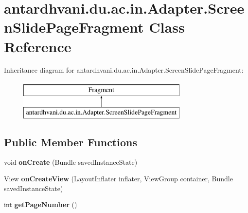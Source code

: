 \hypertarget{classantardhvani_1_1du_1_1ac_1_1in_1_1_adapter_1_1_screen_slide_page_fragment}{}\section{antardhvani.\+du.\+ac.\+in.\+Adapter.\+Screen\+Slide\+Page\+Fragment Class Reference}
\label{classantardhvani_1_1du_1_1ac_1_1in_1_1_adapter_1_1_screen_slide_page_fragment}
Inheritance diagram for antardhvani.\+du.\+ac.\+in.\+Adapter.\+Screen\+Slide\+Page\+Fragment\+:\begin{figure}[H]
\begin{center}
\leavevmode
\includegraphics[height=2.000000cm]{classantardhvani_1_1du_1_1ac_1_1in_1_1_adapter_1_1_screen_slide_page_fragment}
\end{center}
\end{figure}
\subsection*{Public Member Functions}
\begin{DoxyCompactItemize}
\item 
\hypertarget{classantardhvani_1_1du_1_1ac_1_1in_1_1_adapter_1_1_screen_slide_page_fragment_a2bf6c26f91cdaa8b4c86f6006f7daad8}{}void {\bfseries on\+Create} (Bundle saved\+Instance\+State)\label{classantardhvani_1_1du_1_1ac_1_1in_1_1_adapter_1_1_screen_slide_page_fragment_a2bf6c26f91cdaa8b4c86f6006f7daad8}

\item 
\hypertarget{classantardhvani_1_1du_1_1ac_1_1in_1_1_adapter_1_1_screen_slide_page_fragment_ac7e7c2d36a926c942084e6d197f306cd}{}View {\bfseries on\+Create\+View} (Layout\+Inflater inflater, View\+Group container, Bundle saved\+Instance\+State)\label{classantardhvani_1_1du_1_1ac_1_1in_1_1_adapter_1_1_screen_slide_page_fragment_ac7e7c2d36a926c942084e6d197f306cd}

\item 
\hypertarget{classantardhvani_1_1du_1_1ac_1_1in_1_1_adapter_1_1_screen_slide_page_fragment_a0717cbd183800c7635a340e020cce4a0}{}int {\bfseries get\+Page\+Number} ()\label{classantardhvani_1_1du_1_1ac_1_1in_1_1_adapter_1_1_screen_slide_page_fragment_a0717cbd183800c7635a340e020cce4a0}

\end{DoxyCompactItemize}
